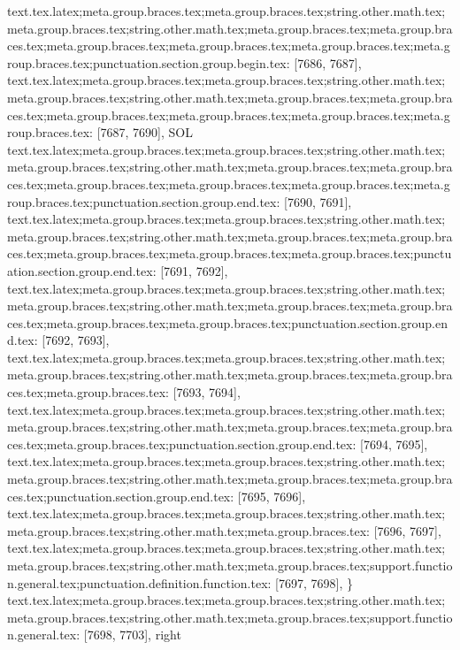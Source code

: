 {{{{{{{{{{{{{{{{{{{{{{{{{{{{{{{{{{{{{{{{{{{{{{{{{{{{{{{{{{{{{{{{{{{{{{{{{{{{{{{{{{{{{{{{{{{{{{{{{{{{{{{{{{{{{{{{{{{{{{{{{{{{{{{{{{{{{{{{{{{{{{{{{{{{{{{{{{{{{{{{{{{{{{{{{{{{{{{{{{{{{{{{{{{{{{{{{{{{{{{{{{{{{{{{{{{{{{{{{{{{{text.tex.latex;meta.group.braces.tex;meta.group.braces.tex;string.other.math.tex;meta.group.braces.tex;string.other.math.tex;meta.group.braces.tex;meta.group.braces.tex;meta.group.braces.tex;meta.group.braces.tex;meta.group.braces.tex;meta.group.braces.tex;punctuation.section.group.begin.tex: [7686, 7687], {{}
text.tex.latex;meta.group.braces.tex;meta.group.braces.tex;string.other.math.tex;meta.group.braces.tex;string.other.math.tex;meta.group.braces.tex;meta.group.braces.tex;meta.group.braces.tex;meta.group.braces.tex;meta.group.braces.tex;meta.group.braces.tex: [7687, 7690], {SOL}
text.tex.latex;meta.group.braces.tex;meta.group.braces.tex;string.other.math.tex;meta.group.braces.tex;string.other.math.tex;meta.group.braces.tex;meta.group.braces.tex;meta.group.braces.tex;meta.group.braces.tex;meta.group.braces.tex;meta.group.braces.tex;punctuation.section.group.end.tex: [7690, 7691], {}}
text.tex.latex;meta.group.braces.tex;meta.group.braces.tex;string.other.math.tex;meta.group.braces.tex;string.other.math.tex;meta.group.braces.tex;meta.group.braces.tex;meta.group.braces.tex;meta.group.braces.tex;meta.group.braces.tex;punctuation.section.group.end.tex: [7691, 7692], {}}
text.tex.latex;meta.group.braces.tex;meta.group.braces.tex;string.other.math.tex;meta.group.braces.tex;string.other.math.tex;meta.group.braces.tex;meta.group.braces.tex;meta.group.braces.tex;meta.group.braces.tex;punctuation.section.group.end.tex: [7692, 7693], {}}
text.tex.latex;meta.group.braces.tex;meta.group.braces.tex;string.other.math.tex;meta.group.braces.tex;string.other.math.tex;meta.group.braces.tex;meta.group.braces.tex;meta.group.braces.tex: [7693, 7694], { }
text.tex.latex;meta.group.braces.tex;meta.group.braces.tex;string.other.math.tex;meta.group.braces.tex;string.other.math.tex;meta.group.braces.tex;meta.group.braces.tex;meta.group.braces.tex;punctuation.section.group.end.tex: [7694, 7695], {}}
text.tex.latex;meta.group.braces.tex;meta.group.braces.tex;string.other.math.tex;meta.group.braces.tex;string.other.math.tex;meta.group.braces.tex;meta.group.braces.tex;punctuation.section.group.end.tex: [7695, 7696], {}}
text.tex.latex;meta.group.braces.tex;meta.group.braces.tex;string.other.math.tex;meta.group.braces.tex;string.other.math.tex;meta.group.braces.tex: [7696, 7697], { }
text.tex.latex;meta.group.braces.tex;meta.group.braces.tex;string.other.math.tex;meta.group.braces.tex;string.other.math.tex;meta.group.braces.tex;support.function.general.tex;punctuation.definition.function.tex: [7697, 7698], {\}
text.tex.latex;meta.group.braces.tex;meta.group.braces.tex;string.other.math.tex;meta.group.braces.tex;string.other.math.tex;meta.group.braces.tex;support.function.general.tex: [7698, 7703], {right}
}}}}}}}}}}}}}}}}}}}}}}}}}}}}}}}}}}}}}}}}}}}}}}}}}}}}}}}}}}}}}}}}}}}}}}}}}}}}}}}}}}}}}}}}}}}}}}}}}}}}}}}}}}}}}}}}}}}}}}}}}}}}}}}}}}}}}}}}}}}}}}}}}}}}}}}}}}}}}}}}}}}}}}}}}}}}}}}}}}}}}}}}}}}}}}}}}}}}}}}}}}}}}}}}}}}}}}}}}}

